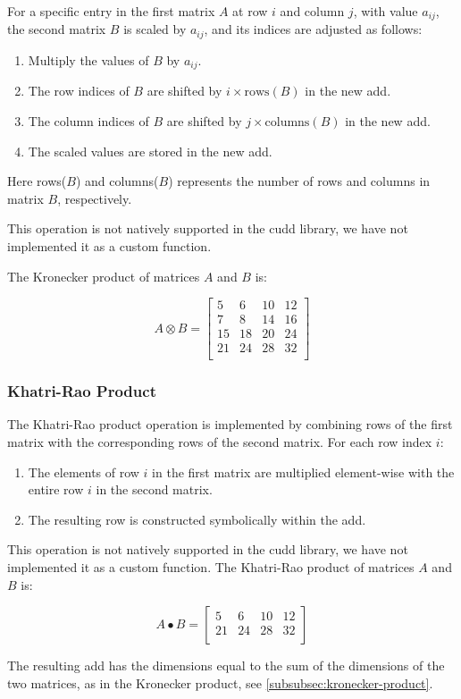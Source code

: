 For a specific entry in the first matrix $A$ at row $i$ and column $j$, with value $a_{ij}$, the second matrix $B$ is scaled by $a_{ij}$, and its indices are adjusted as follows:

\begin{enumerate}
    \item Multiply the values of $B$ by $a_{ij}$.
    \item The row indices of $B$ are shifted by $i \times \text{rows}(B)$ in the new \gls{add}.
    \item The column indices of $B$ are shifted by $j \times \text{columns}(B)$ in the new \gls{add}.
    \item The scaled values are stored in the new \gls{add}.
\end{enumerate}

Here rows($B$) and columns($B$) represents the number of rows and columns in matrix $B$, respectively.

This operation is not natively supported in the \gls{cudd} library, we have not implemented it as a custom function.

The Kronecker product of matrices $A$ and $B$ is:

\[
    A \otimes B = \begin{bmatrix}
                      5  & 6  & 10 & 12 \\
                      7  & 8  & 14 & 16 \\
                      15 & 18 & 20 & 24 \\
                      21 & 24 & 28 & 32 \\
    \end{bmatrix}
\]

\subsubsection{Khatri-Rao Product}
The Khatri-Rao product operation is implemented by combining rows of the first matrix with the corresponding rows of the second matrix.
For each row index $i$:

\begin{enumerate}
    \item The elements of row $i$ in the first matrix are multiplied element-wise with the entire row $i$ in the second matrix.
    \item The resulting row is constructed symbolically within the \gls{add}.
\end{enumerate}

This operation is not natively supported in the \gls{cudd} library, we have not implemented it as a custom function.
The Khatri-Rao product of matrices $A$ and $B$ is:

\[
    A \bullet B = \begin{bmatrix}
                      5  & 6  & 10 & 12 \\
                      21 & 24 & 28 & 32 \\
    \end{bmatrix}
\]

The resulting \gls{add} has the dimensions equal to the sum of the dimensions of the two matrices, as in the Kronecker product, see \autoref{subsubsec:kronecker-product}.
